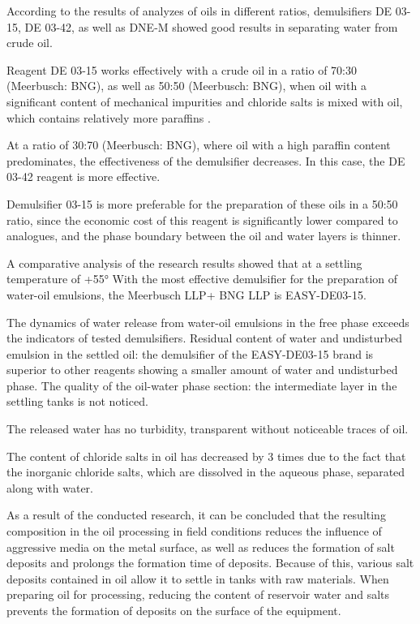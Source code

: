 \begin{multicols}{2}
According to the results of analyzes of oils in different ratios,
demulsifiers DE 03-15, DE 03-42, as well as DNE-M showed good results in
separating water from crude oil.

Reagent DE 03-15 works effectively with a crude oil in a ratio of 70:30
(Meerbusch: BNG), as well as 50:50 (Meerbusch: BNG), when oil with a
significant content of mechanical impurities and chloride salts is mixed
with oil, which contains relatively more paraffins .

At a ratio of 30:70 (Meerbusch: BNG), where oil with a high paraffin
content predominates, the effectiveness of the demulsifier decreases. In
this case, the DE 03-42 reagent is more effective.

Demulsifier 03-15 is more preferable for the preparation of these oils
in a 50:50 ratio, since the economic cost of this reagent is
significantly lower compared to analogues, and the phase boundary
between the oil and water layers is thinner.

A comparative analysis of the research results showed that at a settling
temperature of +55° With the most effective demulsifier for the
preparation of water-oil emulsions, the Meerbusch LLP+ BNG LLP is
EASY-DE03-15.

The dynamics of water release from water-oil emulsions in the free phase
exceeds the indicators of tested demulsifiers. Residual content of water
and undisturbed emulsion in the settled oil: the demulsifier of the
EASY-DE03-15 brand is superior to other reagents showing a smaller
amount of water and undisturbed phase. The quality of the oil-water
phase section: the intermediate layer in the settling tanks is not
noticed.

The released water has no turbidity, transparent without noticeable
traces of oil.

The content of chloride salts in oil has decreased by 3 times due to the
fact that the inorganic chloride salts, which are dissolved in the
aqueous phase, separated along with water.

As a result of the conducted research, it can be concluded that the
resulting composition in the oil processing in field conditions reduces
the influence of aggressive media on the metal surface, as well as
reduces the formation of salt deposits and prolongs the formation time
of deposits. Because of this, various salt deposits contained in oil
allow it to settle in tanks with raw materials. When preparing oil for
processing, reducing the content of reservoir water and salts prevents
the formation of deposits on the surface of the equipment.


\end{multicols}
